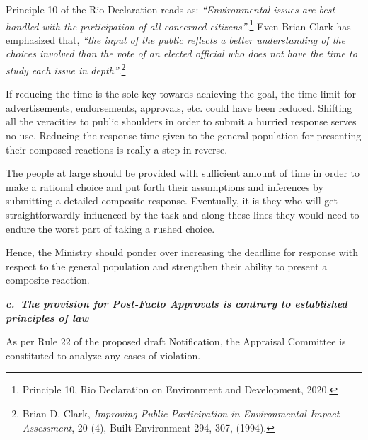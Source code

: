 \begin{multicols}{2}
\noi
Principle 10 of the Rio Declaration reads as: \textit{“Environmental issues are best handled with the
participation of all concerned citizens”}.\footnote{Principle 10, Rio Declaration on Environment and Development, 2020.} Even Brian Clark has emphasized that, \textit{“the input
of the public reflects a better understanding of the choices involved than the vote of an
elected official who does not have the time to study each issue in depth”}.\footnote{Brian D. Clark, \textit{Improving Public Participation in Environmental Impact Assessment}, 20 (4), Built
Environment 294, 307, (1994).}

\vspace{-.05cm}

\noi
If reducing the time is the sole key towards achieving the goal, the time limit for
advertisements, endorsements, approvals, etc. could have been reduced. Shifting all the
veracities to public shoulders in order to submit a hurried response serves no use.
Reducing the response time given to the general population for presenting their composed
reactions is really a step-in reverse. 

\vspace{-.05cm}

\noi
The people at large should be provided with sufficient amount of time in order to make a
rational choice and put forth their assumptions and inferences by submitting a detailed
composite response. Eventually, it is they who will get straightforwardly influenced by the
task and along these lines they would need to endure the worst part of taking a rushed choice. 

\vspace{-.05cm}

\noi
Hence, the Ministry should ponder over increasing the deadline for response with respect to
the general population and strengthen their ability to present a composite reaction. 

\vspace{-.02cm}

\noi
{\large\it\bfseries c.~The provision for Post-Facto Approvals is contrary to established principles of law}

\vspace{-.05cm}

\noi
As per Rule 22 of the proposed draft Notification, the Appraisal Committee is constituted to
analyze any cases of violation. 

\vspace{-.05cm}


\end{multicols}
